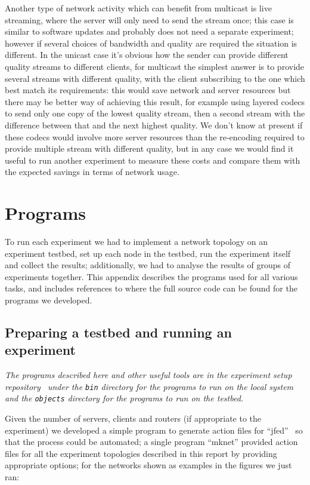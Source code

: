 \documentclass[a4paper,12pt]{article}
\begin{document}
Another type of network activity which can benefit from multicast is
live streaming, where the server will only need to send the stream once;
this case is similar to software updates and probably does not need a
separate experiment; however if several choices of bandwidth and quality
are required the situation is different.  In the unicast case it's obvious
how the sender can provide different quality streams to different clients,
for multicast the simplest answer is to provide several streams with
different quality, with the client subscribing to the one which best
match its requirements: this would save network and server resources
but there may be better way of achieving this result, for example using
layered codecs to send only one copy of the lowest quality stream, then
a second stream with the difference between that and the next highest
quality. We don't know at present if these codecs would involve more
server resources than the re-encoding required to provide multiple
stream with different quality, but in any case we would find it useful
to run another experiment to measure these costs and compare them with
the expected savings in terms of network usage.

\appendix
\section{Programs}
\label{programs}

To run each experiment we had to implement a network topology on an
experiment testbed, set up each node in the testbed, run the experiment
itself and collect the results; additionally, we had to analyse the
results of groups of experiments together.  This appendix describes
the programs used for all various tasks, and includes references to
where the full source code can be found for the programs we developed.

\subsection{Preparing a testbed and running an experiment}

{\em The programs described here and other useful tools are in the experiment
setup repository~\cite{exp:scripts} under the {\tt bin} directory for
the programs to run on the local system and the {\tt objects} directory
for the programs to run on the testbed.}

Given the number of servers, clients and routers (if appropriate to the
experiment) we developed a simple program to generate action files
for ``jfed''~\cite{jfed} so that the process could be automated; a single program
``mknet'' provided action files for all the experiment topologies
described in this report by providing appropriate options; for the
networks shown as examples in the figures we just ran:
\end{document}
